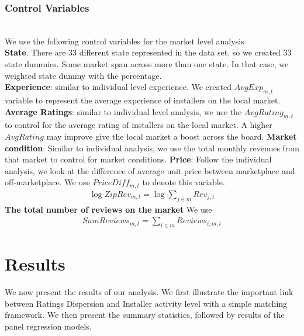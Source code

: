 \documentclass[msom,blindrev]{informs3}
\begin{document}
\subsubsection{Control Variables}\hfill\\
We use the following control variables for the market level analysis\\
\textbf{State}. There are 33 different state represented in the data set, so we created 33 state dummies. Some market span across more than one state. In that case, we weighted state dummy with the percentage. \\
\textbf{Experience}: similar to individual level experience. We created $AvgExp_{m,t}$ variable to represent the average experience of installers on the local market. \\
\textbf{Average Ratings}: similar to individual level analysis, we use the $AvgRating_{m,t}$ to control for the average rating of installers on the local market. A higher $AvgRating$ may improve give the local market a boost across the board. 
\textbf{Market condition}:
Similar to individual analysis, we use the total monthly revenues from that market to control for market conditions.
\textbf{Price}: Follow the individual analysis, we look at the difference of average unit price between marketplace and off-marketplace. We use $PriceDiff_{m,t}$ to denote this variable.  \\ 
\begin{align*}
\log ZipRev_{m,t}=\log \sum_{j\in m}Rev_{j,t}
\end{align*}
 \textbf{The total number of reviews on the market } We use
\begin{align*}
SumReviews_{m,t}=\sum_{i\in m} Reviews_{i,m,t}
\end{align*}


\section{Results}
We now present the results of our analysis. We first illustrate the important link between Ratings Dispersion and Installer activity level with a simple matching framework. We then present the summary statistics, followed by results of the panel regression models. 
\end{document}
